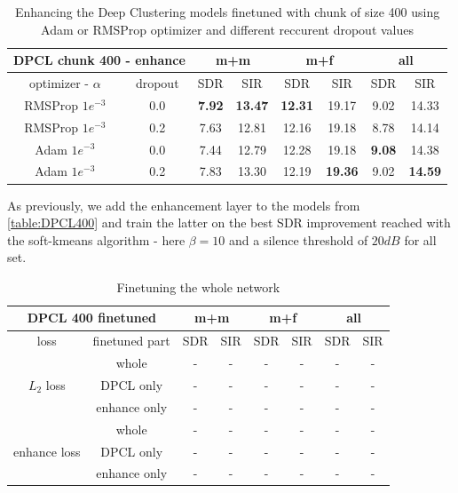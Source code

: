\documentclass[master, tikz, final,11pt, dvipdfmx]{iscs-thesis}
\begin{document}
\begin{table}[h]
\centering
\begin{tabular}{c|c|c|c|c|c|c|c}
\multicolumn{2}{c|}{DPCL chunk 400 - enhance} & \multicolumn{2}{c|}{m+m} & \multicolumn{2}{c|}{m+f} & \multicolumn{2}{c}{all} \\ 
\hline 
optimizer - $\alpha$ & dropout & SDR & SIR & SDR & SIR & SDR & SIR \\ 
\hline 
RMSProp $1e^{-3}$ & 0.0 & \textbf{7.92} & \textbf{13.47} & \textbf{12.31} & 19.17 & 9.02 & 14.33 \\ 
RMSProp $1e^{-3}$ & 0.2 & 7.63 & 12.81 & 12.16 & 19.18 & 8.78 & 14.14 \\ 
Adam $1e^{-3}$ & 0.0 & 7.44 & 12.79 & 12.28 & 19.18 & \textbf{9.08} & 14.38 \\
Adam $1e^{-3}$ & 0.2 & 7.83 & 13.30 & 12.19 & \textbf{19.36} & 9.02 & \textbf{14.59}\\ 
\end{tabular}
\captionsetup{justification=centering}
\caption{Enhancing the Deep Clustering models finetuned with chunk of size 400 using Adam or RMSProp optimizer and different reccurent dropout values}
\label{table:DPCL400enh}
\end{table}

As previously, we add the enhancement layer to the models from \ref{table:DPCL400} and train the latter on the best SDR improvement reached with the soft-kmeans algorithm - here $\beta = 10$ and a silence threshold of $20dB$ for all set. 

\begin{table}[h]
\centering
\begin{tabular}{c|c|c|c|c|c|c|c}
\multicolumn{2}{c|}{DPCL 400 finetuned} & \multicolumn{2}{c|}{m+m} & \multicolumn{2}{c|}{m+f} & \multicolumn{2}{c}{all} \\ 
\hline 
 loss & finetuned part & SDR & SIR & SDR & SIR & SDR & SIR \\ 
\hline 
\multirow{3}{*}{$L_2$ loss} & whole & - & - & - & - & - & - \\ 
\cline{2-8} 
 & DPCL only & - & - & - & - & - & - \\ 
\cline{2-8} 
 & enhance only & - & - & - & - & - & - \\ 
\hline
\multirow{3}{*}{enhance loss} & whole & - & - & - & - & - & - \\ 
\cline{2-8} 
 & DPCL only & - & - & - & - & - & - \\ 
\cline{2-8}
 & enhance only & - & - & - & - & - & - \\ 
\hline 
\end{tabular}
\captionsetup{justification=centering}
\caption{Finetuning the whole network}
\label{table:DPCL400fine}
\end{table}
\end{document}
